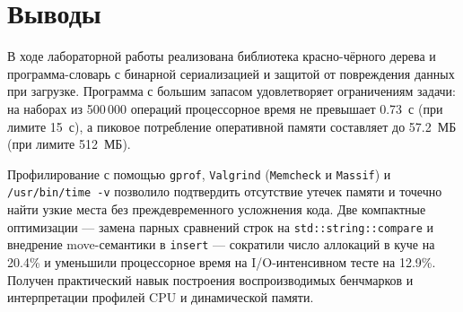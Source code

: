 \section{Выводы}
В ходе лабораторной работы реализована библиотека красно-чёрного дерева и программа-словарь с бинарной сериализацией и защитой от повреждения данных при загрузке. Программа с большим запасом удовлетворяет ограничениям задачи: на наборах из 500\,000 операций процессорное время не превышает 0.73~с (при лимите 15~с), а пиковое потребление оперативной памяти составляет до 57.2~МБ (при лимите 512~МБ).

Профилирование с помощью \texttt{gprof}, \texttt{Valgrind} (\texttt{Memcheck} и \texttt{Massif}) и \texttt{/usr/bin/time -v} позволило подтвердить отсутствие утечек памяти и точечно найти узкие места без преждевременного усложнения кода. Две компактные оптимизации --- замена парных сравнений строк на \texttt{std::string::compare} и внедрение move-семантики в \texttt{insert} --- сократили число аллокаций в куче на 20.4\% и уменьшили процессорное время на I/O-интенсивном тесте на 12.9\%. Получен практический навык построения воспроизводимых бенчмарков и интерпретации профилей CPU и динамической памяти.
\pagebreak
